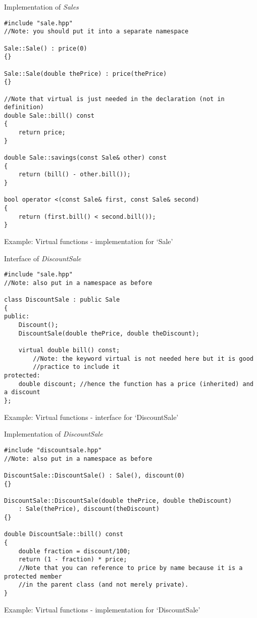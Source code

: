 \noindent
Implementation of \emph{Sales}
\begin{listing}[H]
\begin{verbatim}
#include "sale.hpp"
//Note: you should put it into a separate namespace

Sale::Sale() : price(0)
{}

Sale::Sale(double thePrice) : price(thePrice)
{}

//Note that virtual is just needed in the declaration (not in definition)
double Sale::bill() const
{
	return price;
}

double Sale::savings(const Sale& other) const
{
	return (bill() - other.bill());
}

bool operator <(const Sale& first, const Sale& second)
{
	return (first.bill() < second.bill());
}
\end{verbatim}
\caption{Example: Virtual functions - implementation for `Sale'}
\label{source_code_1}
\end{listing}


\noindent
Interface of \emph{DiscountSale}
\begin{listing}[H]
\begin{verbatim}
#include "sale.hpp"
//Note: also put in a namespace as before

class DiscountSale : public Sale
{
public:
	Discount();
	DiscountSale(double thePrice, double theDiscount);
	
	virtual double bill() const;
		//Note: the keyword virtual is not needed here but it is good
		//practice to include it
protected:
	double discount; //hence the function has a price (inherited) and a discount
};
\end{verbatim}
\caption{Example: Virtual functions - interface for `DiscountSale'}
\label{source_code_1}
\end{listing}


\noindent
Implementation of \emph{DiscountSale}
\begin{listing}[H]
\begin{verbatim}
#include "discountsale.hpp"
//Note: also put in a namespace as before

DiscountSale::DiscountSale() : Sale(), discount(0)
{}

DiscountSale::DiscountSale(double thePrice, double theDiscount)
	: Sale(thePrice), discount(theDiscount)
{}

double DiscountSale::bill() const
{
	double fraction = discount/100;
	return (1 - fraction) * price;
	//Note that you can reference to price by name because it is a protected member
	//in the parent class (and not merely private).
}
\end{verbatim}
\caption{Example: Virtual functions - implementation for `DiscountSale'}
\label{source_code_1}
\end{listing}

